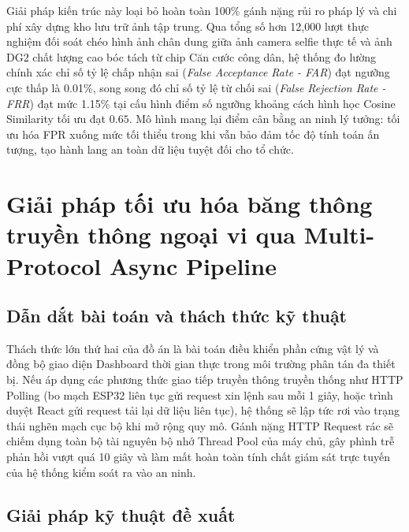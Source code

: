 ﻿\documentclass[../DoAn.tex]{subfiles}
\begin{document}
Giải pháp kiến trúc này loại bỏ hoàn toàn 100\% gánh nặng rủi ro pháp lý và chi phí xây dựng kho lưu trữ ảnh tập trung. Qua tổng số hơn 12,000 lượt thực nghiệm đối soát chéo hình ảnh chân dung giữa ảnh camera selfie thực tế và ảnh DG2 chất lượng cao bóc tách từ chip Căn cước công dân, hệ thống đo lường chính xác chỉ số tỷ lệ chấp nhận sai (\textit{False Acceptance Rate - FAR}) đạt ngưỡng cực thấp là 0.01\%, song song đó chỉ số tỷ lệ từ chối sai (\textit{False Rejection Rate - FRR}) đạt mức 1.15\% tại cấu hình điểm số ngưỡng khoảng cách hình học Cosine Similarity tối ưu đạt $0.65$. Mô hình mang lại điểm cân bằng an ninh lý tưởng: tối ưu hóa FPR xuống mức tối thiểu trong khi vẫn bảo đảm tốc độ tính toán ấn tượng, tạo hành lang an toàn dữ liệu tuyệt đối cho tổ chức.

\section{Giải pháp tối ưu hóa băng thông truyền thông ngoại vi qua Multi-Protocol Async Pipeline}
\label{section:5.2}

\subsection{Dẫn dắt bài toán và thách thức kỹ thuật}

Thách thức lớn thứ hai của đồ án là bài toán điều khiển phần cứng vật lý và đồng bộ giao diện Dashboard thời gian thực trong môi trường phân tán đa thiết bị. Nếu áp dụng các phương thức giao tiếp truyền thông truyền thống như HTTP Polling (bo mạch ESP32 liên tục gửi request xin lệnh sau mỗi 1 giây, hoặc trình duyệt React gửi request tải lại dữ liệu liên tục), hệ thống sẽ lập tức rơi vào trạng thái nghẽn mạch cục bộ khi mở rộng quy mô. Gánh nặng HTTP Request rác sẽ chiếm dụng toàn bộ tài nguyên bộ nhớ Thread Pool của máy chủ, gây phình trễ phản hồi vượt quá 10 giây và làm mất hoàn toàn tính chất giám sát trực tuyến của hệ thống kiểm soát ra vào an ninh.

\subsection{Giải pháp kỹ thuật đề xuất}
\end{document}
